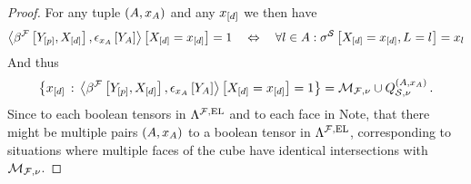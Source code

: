 \begin{proof}
    For any tuple $(A,x_{A})$ and any $x_{[d]}$ we then have
    \begin{align*}
        \left\langle \beta^{\mathcal{F}}\left[Y_{[p]},X_{[d]}\right],\epsilon_{x_{A}}\left[Y_{A}\right]\right\rangle \left[ X_{[d]}=x_{[d]} \right]=1
        \quad \Leftrightarrow \quad
        \forall{l\in A}:{\sigma^{\mathcal{S}}\left[X_{[d]}=x_{[d]},L_{}=l_{}\right]=x_{l}}
    \end{align*}
    And thus
    \begin{align*}
        \left\{x_{[d]}\,:\,\left\langle \beta^{\mathcal{F}}\left[Y_{[p]},X_{[d]}\right],\epsilon_{x_{A}}\left[Y_{A}\right]\right\rangle \left[ X_{[d]}=x_{[d]} \right]=1\right\}
        = \mathcal{M}_{\mathcal{F},\nu} \cup Q^{(A,x_{A})}_{\mathcal{S},\nu} \, .
    \end{align*}
    Since to each boolean tensors in $\Lambda^{\mathcal{F},\mathrm{EL}}$ and to each face in
    Note, that there might be multiple pairs $(A,x_{A})$ to a boolean tensor in $\Lambda^{\mathcal{F},\mathrm{EL}}$, corresponding to situations where multiple faces of the cube have identical intersections with $\mathcal{M}_{\mathcal{F},\nu}$.
\end{proof}

%
%

